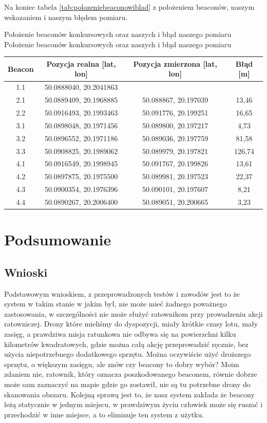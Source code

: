 Na koniec tabela \ref{tab:polozeniebeaconowiblad} z położeniem beaconów, naszym wskazaniem i naszym błędem pomiaru.

\begin{tablica}
    {Położenie beaconów konkursowych oraz naszych i błąd naszego pomiaru}
    {Położenie beaconów konkursowych oraz naszych i błąd naszego pomiaru}
    {
    \begin{tabular}{|c|c|c|c|} \hline
	    \textbf{Beacon} & \textbf{Pozycja realna [lat, lon]} & \textbf{Pozycja zmierzona [lat, lon]} & \textbf{Błąd [m]} \\ \hline
	    1.1 & 50.0888040, 20.2041863 & & \\ \hline
	    2.1 & 50.0889409, 20.1968885 & 50.088867, 20.197039 & 13,46 \\ \hline
	    2.2 & 50.0916493, 20.1993463 & 50.091776, 20.199251 & 16,65 \\ \hline
	    3.1 & 50.0898048, 20.1971456 & 50.089800, 20.197217 & 4,73 \\ \hline
	    3.2 & 50.0896552, 20.1971186 & 50.089036, 20.197759 & 81,58 \\ \hline
	    3.3 & 50.0908825, 20.1989062 & 50.089979, 20.197821 & 126,74 \\ \hline
	    4.1 & 50.0916549, 20.1998945 & 50.091767, 20.199826 & 13,61 \\ \hline
	    4.2 & 50.0897875, 20.1975500 & 50.089981, 20.197523 & 22,37 \\ \hline
	    4.3 & 50.0900354, 20.1976396 & 50.090101, 20.197607 & 8,21 \\ \hline
	    4.4 & 50.0890267, 20.2006400 & 50.089051, 20.200665 & 3,23 \\ \hline
   \end{tabular}
    }
    \label{tab:polozeniebeaconowiblad}
\end{tablica}

\section{Podsumowanie}

\subsection{Wnioski}

Podstawowym wnioskiem, z przeprowadzonych testów i zawodów jest to że system w takim stanie w jakim był, nie może mieć żadnego poważnego zastosowania, w szczególności nie może służyć ratownikom przy prowadzeniu akcji ratowniczej. Drony które mieliśmy do dyspozycji, miały krótkie czasy lotu, mały zasięg, a prawdziwa misja ratunkowa nie odbywa się na powierzchni kilku kilometrów kwadratowych, gdzie można całą akcję przeprowadzić ręcznie, bez użycia niepotrzebnego dodatkowego sprzętu. Można oczywiście użyć droższego sprzętu, o większym zasięgu, ale znów czy beacony to dobry wybór? Moim zdaniem nie, ratownik, który oznacza poszkodowanego beaconem, równie dobrze może sam zaznaczyć na mapie gdzie go zostawił, nie są tu potrzebne drony do skanowania obszaru. Kolejną sprawą jest to, że nasz system zakłada że beacony leżą statycznie w jednym miejscu, w prawdziwym życiu człowiek może się ruszać i przechodzić w inne miejsce, a to eliminuje ten system z użytku.

